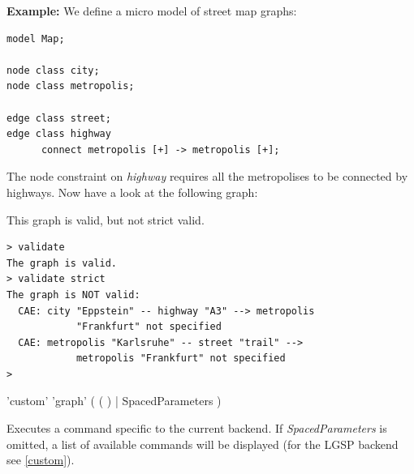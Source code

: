 \documentclass[a4paper,11pt]{report}
\begin{document}
{\small \textbf{Example:} We define a micro model of street map graphs:
\lstset{language=grgenmodel}
\begin{lstlisting} 
model Map;

node class city;
node class metropolis;

edge class street;
edge class highway
      connect metropolis [+] -> metropolis [+];
\end{lstlisting}
The node constraint on \emph{highway} requires all the metropolises to be connected by highways. Now have a look at the following graph:
\begin{center}
\end{center}

This graph is valid, but not strict valid.
\lstset{language=grshell}
\begin{lstlisting} 
> validate
The graph is valid.
> validate strict
The graph is NOT valid:
  CAE: city "Eppstein" -- highway "A3" --> metropolis 
            "Frankfurt" not specified
  CAE: metropolis "Karlsruhe" -- street "trail" --> 
            metropolis "Frankfurt" not specified
>
\end{lstlisting}}

\begin{rail}
  'custom' 'graph' ( ( ) | SpacedParameters )
\end{rail}
Executes a command specific to the current backend. If \emph{SpacedParameters} is omitted, a list of available commands will be displayed (for the LGSP backend see \ref{custom}).
\end{document}
